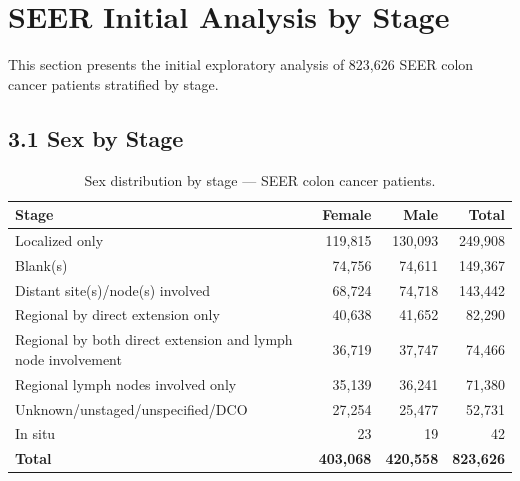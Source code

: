 \documentclass[11pt, a4paper]{article}
\begin{document}
\vspace{10pt}

\section{SEER Initial Analysis by Stage}

\noindent This section presents the initial exploratory analysis of 823,626 SEER colon cancer patients stratified by stage.

\vspace{6pt}

\subsection*{3.1 Sex by Stage}

\begin{table}[H]
\centering
\renewcommand{\arraystretch}{1.3}
\begin{tabular}{lrrr}
\toprule
\textbf{Stage} & \textbf{Female} & \textbf{Male} & \textbf{Total} \\
\midrule
Localized only                                               & 119,815 & 130,093 & 249,908 \\
Blank(s)                                                     &  74,756 &  74,611 & 149,367 \\
Distant site(s)/node(s) involved                             &  68,724 &  74,718 & 143,442 \\
Regional by direct extension only                            &  40,638 &  41,652 &  82,290 \\
Regional by both direct extension and lymph node involvement &  36,719 &  37,747 &  74,466 \\
Regional lymph nodes involved only                           &  35,139 &  36,241 &  71,380 \\
Unknown/unstaged/unspecified/DCO                             &  27,254 &  25,477 &  52,731 \\
In situ                                                      &      23 &      19 &      42 \\
\midrule
\textbf{Total}                                               & \textbf{403,068} & \textbf{420,558} & \textbf{823,626} \\
\bottomrule
\end{tabular}
\caption{Sex distribution by stage --- SEER colon cancer patients.}
\end{table}
\end{document}
